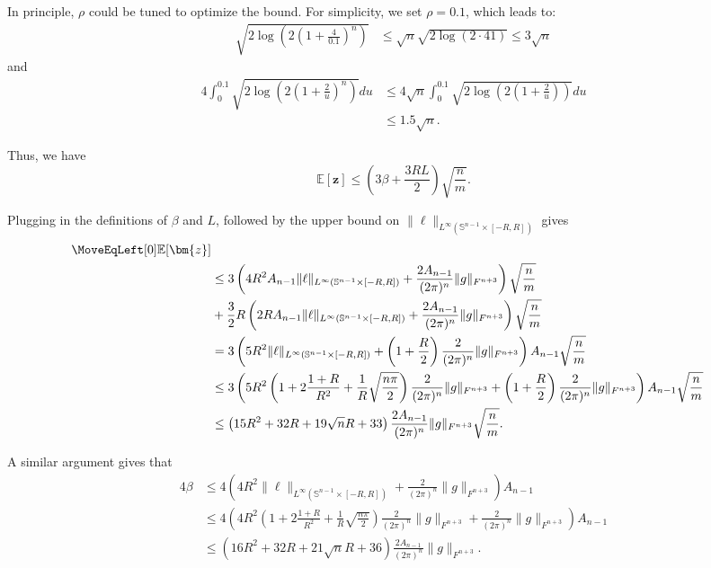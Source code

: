 \documentclass[twoside]{article}
\theoremstyle{definition}
\newcommand{\E}{\mathbb{E}}
\renewcommand{\S}{\mathbb{S}}
\newcommand{\1}[1]{\scalebox{1.25}{$\mathds{1}$}\left[#1\right]}
\begin{document}
In principle, $\rho$ could be tuned to optimize the bound. For simplicity, we set $\rho = 0.1$, which leads to:
\begin{align*}
\sqrt{2\log\left(2\left(1+\frac{4}{0.1}\right)^n\right)}&\le \sqrt{n}\sqrt{2\log(2\cdot 41)}
\le 3\sqrt{n}
\end{align*}
and
\begin{align*}
4 \int_0^{0.1}\sqrt{2\log\left(2\left(1+\frac{2}{u}\right)^n\right)}du &\le 
4\sqrt{n}\int_0^{0.1}\sqrt{2\log\left(2\left(1+\frac{2}{u}\right)\right)}du\\
&\le 1.5\sqrt{n}.
\end{align*}

Thus, we have
\begin{equation*}
\E[\bm{z}]\le \left(3\beta
+\frac{3RL}{2}\right)\sqrt{\frac{n}{m}}.
\end{equation*}

Plugging in the definitions of $\beta$ and $L$, followed by the upper bound on $\|\ell\|_{L^{\infty}(\S^{n-1}\times [-R,R])}$ gives
\begin{align*}
\MoveEqLeft[0]
\E[\bm{z}]
\\
&\le 3 \left(
4R^2 A_{n-1}\|\ell\|_{L^{\infty}(\S^{n-1}\times [-R,R])} + \frac{2A_{n-1}}{(2\pi)^n}\|g\|_{F^{n+3}}
\right)\sqrt{\frac{n}{m}}
\\&
+\frac{3}{2} R\left(
2RA_{n-1}\|\ell\|_{L^\infty(\S^{n-1}\times[-R,R])}+\frac{2A_{n-1}}{(2\pi)^n}\|g\|_{F^{n+3}}
\right)\sqrt{\frac{n}{m}}\\
&=3\left(5R^2 \|\ell\|_{L^{\infty}(\S^{n-1}\times[-R,R])}+\left(1+\frac{R}{2}\right)\frac{2}{(2\pi)^n}\|g\|_{F^{n+3}} \right) A_{n-1}\sqrt{\frac{n}{m}}
\\
&\le 
3\left(5R^2 
\left(1+2\frac{1+R}{R^2}+\frac{1}{R}\sqrt{\frac{n \pi}{2}}\right)
\frac{2}{(2\pi)^n}
\|g\|_{F^{n+3}}
+\left(1+\frac{R}{2}\right)\frac{2}{(2\pi)^n}\|g\|_{F^{n+3}} \right) A_{n-1}\sqrt{\frac{n}{m}}
\\
&\le 
\left(15 R^2+32R +19 \sqrt{n}R+33\right) \frac{2A_{n-1}}{(2\pi)^n}\|g\|_{F^{n+3}}\sqrt{\frac{n}{m}}.
\end{align*}

A similar argument gives that
\begin{align*}
4\beta &\le 4 \left(
4R^2 \|\ell\|_{L^{\infty}(\S^{n-1}\times [-R,R])} + \frac{2}{(2\pi)^n}\|g\|_{F^{n+3}}
\right)A_{n-1} \\
&\le
4 \left(
4R^2
\left(1+2\frac{1+R}{R^2}+\frac{1}{R}\sqrt{\frac{n \pi}{2}}\right)
\frac{2}{(2\pi)^n}
\|g\|_{F^{n+3}}
+ \frac{2}{(2\pi)^n}\|g\|_{F^{n+3}}
\right)A_{n-1} \\
&\le \left(
16R^2+32R+21\sqrt{n}R+36
\right)\frac{2A_{n-1}}{(2\pi)^n}\|g\|_{F^{n+3}}.
\end{align*}
\end{document}
